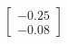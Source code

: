 \documentclass[preview]{standalone}
\begin{document}
\begin{align*}
\begin{bmatrix} -0.25 \\ -0.08 \end{bmatrix}
\end{align*}
\end{document}
